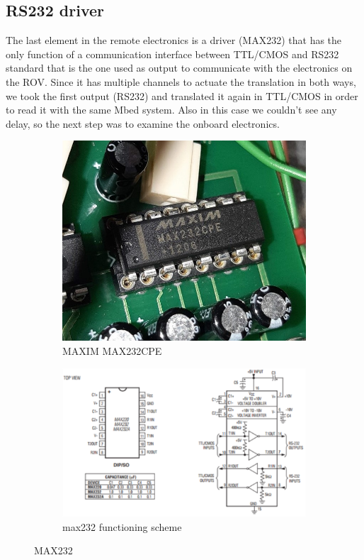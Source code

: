 \documentclass[12pt, a4paper]{article}
\begin{document}
\subsection{RS232 driver}	
The last element in the remote electronics is a driver (MAX232) that has the only function of a communication interface between TTL/CMOS and RS232 standard that is the one used as output to communicate with the electronics on the ROV. Since it has multiple channels to actuate the translation in both ways, we took the first output (RS232) and translated it again in TTL/CMOS in order to read it with the same Mbed system. Also in this case we couldn’t see any delay, so the next step was to examine the onboard electronics. 

\begin{figure}[h]
	\begin{subfigure}[t]{0.4\textwidth}
		\includegraphics[width=\textwidth]{max232} 
		\caption{MAXIM MAX232CPE}
		\label{fig:max232}
	\end{subfigure}
	\hfill%
	\begin{subfigure}[t]{0.4\textwidth}
		\includegraphics[width=\textwidth]{max232_scheme}
		\caption{max232 functioning scheme}
		\label{fig:max232_scheme}
	\end{subfigure}
 	\caption{MAX232}
	\label{fig:max}
\end{figure}
\end{document}
